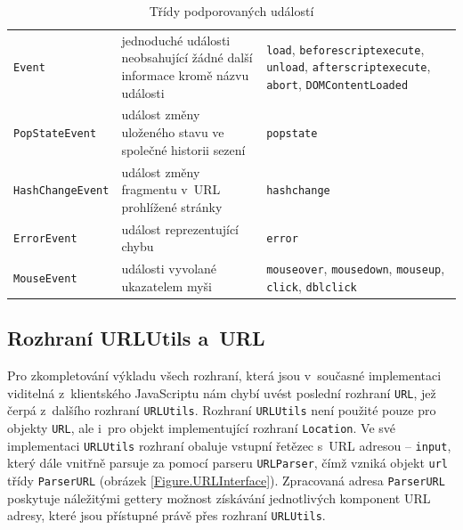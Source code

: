 \begin{table}[H]
  \begin{center} 
    \begin{tabular}{|l|p{5cm}|P{6cm}|} \hline
     &  &  \\ \hline
    \texttt{Event} & jednoduché události neobsahující žádné další informace kromě názvu události & \texttt{load}, \texttt{beforescriptexecute}, \mbox{\texttt{unload}}, \texttt{afterscriptexecute}, \texttt{abort}, \texttt{DOMContentLoaded} \\ \hline
    \texttt{PopStateEvent} & událost změny uloženého stavu ve společné historii sezení & \texttt{popstate} \\ \hline
    \texttt{HashChangeEvent} & událost změny fragmentu v~URL prohlížené stránky & \texttt{hashchange} \\ \hline
    \texttt{ErrorEvent} & událost reprezentující chybu & \texttt{error} \\ \hline
    \texttt{MouseEvent} & události vyvolané ukazatelem myši & \texttt{mouseover}, \texttt{mousedown}, \texttt{mouseup}, \texttt{click}, \texttt{dblclick} \\ \hline
    \end{tabular}
    \caption{Třídy podporovaných událostí}
    \label{Table.SupportedEvents}
  \end{center}
\end{table}

\subsection{Rozhraní URLUtils a~URL}
\label{Chapter.Implementation.URLUtilsInterface}

Pro zkompletování výkladu všech rozhraní, která jsou v~současné implementaci viditelná z~klientského JavaScriptu nám chybí uvést poslední rozhraní \texttt{URL}, jež čerpá z~dalšího rozhraní \texttt{URLUtils}. Rozhraní \texttt{URLUtils} není použité pouze pro objekty \texttt{URL}, ale i~pro objekt implementující rozhraní \texttt{Location}. Ve své implementaci \texttt{URLUtils} rozhraní obaluje vstupní řetězec s~URL adresou -- \texttt{input}, který dále vnitřně parsuje za pomocí parseru \texttt{URLParser}, čímž vzniká objekt \texttt{url} třídy \texttt{ParserURL} (obrázek \ref{Figure.URLInterface}). Zpracovaná adresa \texttt{ParserURL} poskytuje náležitými gettery možnost získávání jednotlivých komponent URL adresy, které jsou přístupné právě přes rozhraní \texttt{URLUtils}. 


